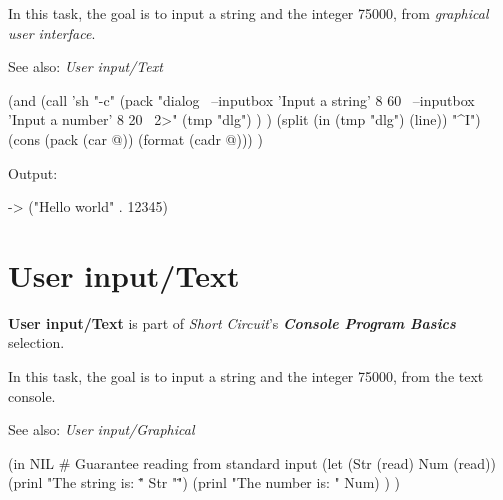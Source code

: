 In this task, the goal is to input a string and the integer 75000,
from \emph{graphical user interface}.

See also: \emph{User input/Text}

\begin{wideverbatim}

(and
   (call 'sh "-c"
      (pack
         "dialog \
            --inputbox 'Input a string' 8 60 \
            --inputbox 'Input a number' 8 20 \
            2>"
         (tmp "dlg") ) )
   (split (in (tmp "dlg") (line)) "^I")
   (cons (pack (car @)) (format (cadr @))) )

Output:

-> ("Hello world" . 12345)

\end{wideverbatim}

\pagebreak{}
\section*{User input/Text}

\textbf{User input/Text} is part of \emph{Short Circuit}'s
\textbf{\emph{Console Program Basics}} selection.

In this task, the goal is to input a string and the integer 75000, from
the text console.

See also: \emph{User input/Graphical}

\begin{wideverbatim}

(in NIL  # Guarantee reading from standard input
   (let (Str (read)  Num (read))
      (prinl "The string is: \"" Str "\"")
      (prinl "The number is: " Num) ) )

\end{wideverbatim}



% 
